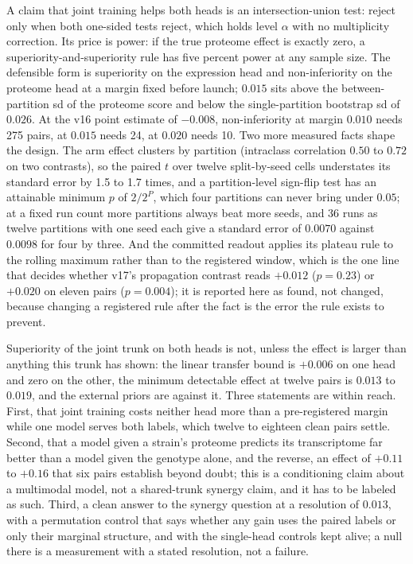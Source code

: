  A claim that joint training helps both
heads is an intersection-union test: reject only when both one-sided tests reject, which holds
level $\alpha$ with no multiplicity correction. Its price is power: if the true proteome
effect is exactly zero, a superiority-and-superiority rule has five percent power at any
sample size. The defensible form is superiority on the expression head and non-inferiority on
the proteome head at a margin fixed before launch; $0.015$ sits above the between-partition sd
of the proteome score and below the single-partition bootstrap sd of $0.026$. At the v16 point
estimate of $-0.008$, non-inferiority at margin $0.010$ needs 275 pairs, at $0.015$ needs 24,
at $0.020$ needs 10. Two more measured facts shape the design. The arm effect clusters by
partition (intraclass correlation $0.50$ to $0.72$ on two contrasts), so the paired $t$ over
twelve split-by-seed cells understates its standard error by 1.5 to 1.7 times, and a
partition-level sign-flip test has an attainable minimum $p$ of $2/2^P$, which four partitions
can never bring under $0.05$; at a fixed run count more partitions always beat more seeds, and
36 runs as twelve partitions with one seed each give a standard error of $0.0070$ against
$0.0098$ for four by three. And the committed readout applies its plateau rule to the rolling
maximum rather than to the registered window, which is the one line that decides whether v17's
propagation contrast reads $+0.012$ ($p = 0.23$) or $+0.020$ on eleven pairs ($p = 0.004$);
it is reported here as found, not changed, because changing a registered rule after the fact
is the error the rule exists to prevent.

 Superiority of the joint trunk on
both heads is not, unless the effect is larger than anything this trunk has shown: the linear
transfer bound is $+0.006$ on one head and zero on the other, the minimum detectable effect at
twelve pairs is $0.013$ to $0.019$, and the external priors are against it. Three statements
are within reach. First, that joint training costs neither head more than a pre-registered
margin while one model serves both labels, which twelve to eighteen clean pairs settle.
Second, that a model given a strain's proteome predicts its transcriptome far better than a
model given the genotype alone, and the reverse, an effect of $+0.11$ to $+0.16$ that six
pairs establish beyond doubt; this is a conditioning claim about a multimodal model, not a
shared-trunk synergy claim, and it has to be labeled as such. Third, a clean answer to the
synergy question at a resolution of $0.013$, with a permutation control that says whether any
gain uses the paired labels or only their marginal structure, and with the single-head
controls kept alive; a null there is a measurement with a stated resolution, not a failure.

